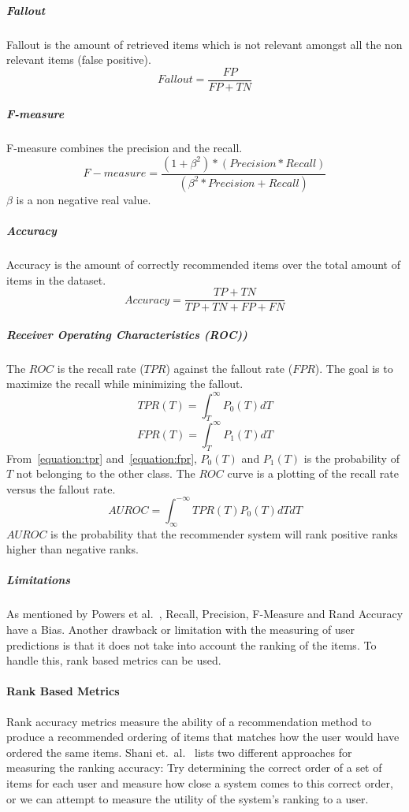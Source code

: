 \subparagraph{Fallout}
Fallout is the amount of retrieved items which is not relevant amongst all the non relevant items (false positive).
\begin{equation}
    Fallout = \frac{FP}{FP+TN}
    \label{equation:fallout}
\end{equation}

\subparagraph{F-measure}
F-measure combines the precision and the recall.
\begin{equation}
    F-measure = \frac{(1 + \beta^2) * (Precision * Recall)}{(\beta^2 * Precision + Recall)}
    \label{equation:f-measure}
\end{equation}
$\beta$ is a non negative real value.

\subparagraph{Accuracy}
Accuracy is the amount of correctly recommended items over the total amount of items in the dataset.
\begin{equation}
    Accuracy = \frac{TP+TN}{TP+TN+FP+FN}
    \label{equation:accuracy}
\end{equation}

\subparagraph{Receiver Operating Characteristics (ROC))}
The $ROC$ is the recall rate ($TPR$) against the fallout rate ($FPR$).
The goal is to maximize the recall while minimizing the fallout.
\begin{equation}
    TPR(T) = \int_T^\infty P_0(T)dT
    \label{equation:tpr}
\end{equation}
\begin{equation}
    FPR(T) = \int_T^\infty P_1(T)dT
    \label{equation:fpr}
\end{equation}
From~\ref{equation:tpr} and~\ref{equation:fpr}, $P_0(T)$ and $P_1(T)$ is the probability of $T$ not belonging to the other class.
The $ROC$ curve is a plotting of the recall rate versus the fallout rate.
\begin{equation}
    AUROC = \int_\infty^{-\infty} TPR(T)P_0(T)dTdT
    \label{equation:auroc}
\end{equation}
$AUROC$ is the probability that the recommender system will rank positive ranks higher than negative ranks.

\subparagraph{Limitations}
\label{subp:limitations}
As mentioned by Powers et al.~\cite{powers2007}, Recall, Precision, F-Measure and Rand Accuracy have a Bias.
Another drawback or limitation with the measuring of user predictions is that it does not take into account the ranking of the items.
To handle this, rank based metrics can be used.


\paragraph{Rank Based Metrics}
Rank accuracy metrics measure the ability of a recommendation method to produce
a recommended ordering of items that matches how the user would have ordered
the same items. Shani et.\ al.~\cite{Shani2011} lists two different approaches
for measuring the ranking accuracy: Try determining the correct order of a set
of items for each user and measure how close a system comes to this correct
order, or we can attempt to measure the utility of the system's ranking to a
user.

